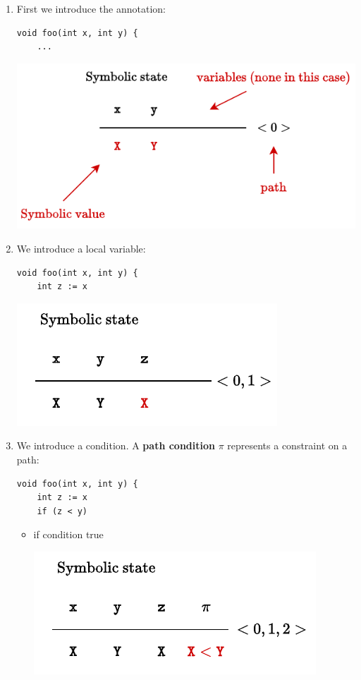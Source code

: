 \begin{examplebox}
    \begin{enumerate}
        \item First we introduce the annotation:
        \begin{lstlisting}
void foo(int x, int y) {
    ...\end{lstlisting}
        \begin{center}
            \includegraphics[width=.7\textwidth]{img/symbolic-state-1.pdf}
        \end{center}


        \item We introduce a local variable:
        \begin{lstlisting}
void foo(int x, int y) {
    int z := x\end{lstlisting}
        \begin{center}
            \includegraphics[width=.5\textwidth]{img/symbolic-state-2.pdf}
        \end{center}


        \item We introduce a condition. A \textbf{path condition} $\pi$ represents a constraint on a path:
        \begin{lstlisting}
void foo(int x, int y) {
    int z := x
    if (z < y)\end{lstlisting}
        \begin{itemize}
            \item if condition true
            \begin{center}
                \includegraphics[width=.5\textwidth]{img/symbolic-state-3.pdf}
            \end{center}


\end{itemize}
\end{enumerate}
\end{examplebox}

